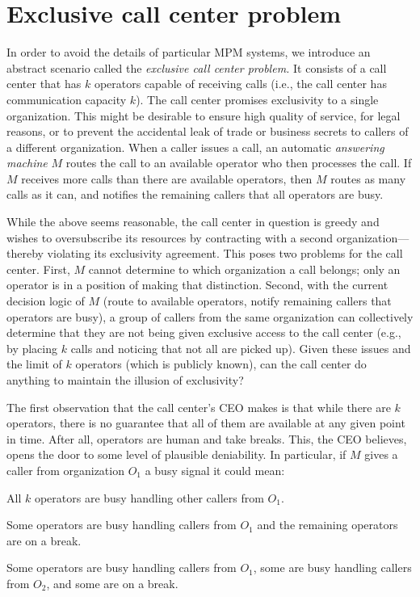 \section{Exclusive call center problem}%
\label{s:problem}

In order to avoid the details of particular MPM systems, we 
  introduce an abstract scenario called the \emph{exclusive call center problem.}
It consists of a call center that has $k$ operators capable
  of receiving calls (i.e., the call center has
  communication capacity $k$).
The call center promises exclusivity to a single organization.
This might be desirable to ensure high quality of service, 
  for legal reasons, or to prevent the accidental leak of trade or business 
  secrets to callers of a different organization.
When a caller issues a call, an automatic \emph{answering machine} $M$ routes 
  the call to an available operator who then processes the call.
If $M$ receives more calls than there are available operators, 
  then $M$ routes as many calls as it can, and notifies the remaining callers
  that all operators are busy.

While the above seems reasonable, the call center in question 
  is greedy and wishes to oversubscribe its resources by contracting with a 
  second organization---thereby violating its exclusivity agreement.
This poses two problems for the call center.
First, $M$ cannot determine to which organization a call belongs; only an
  operator is in a position of making that distinction.
Second, with the current decision logic of $M$ (route to available operators,
  notify remaining callers that operators are busy), a group of callers from 
  the same organization can collectively determine that they are not being given 
  exclusive access to the call center (e.g., by placing $k$ calls 
  and noticing that not all are picked up).
Given these issues and the limit of $k$ operators (which is publicly known), 
  can the call center do anything to maintain the illusion of exclusivity?

The first observation that the call center's CEO makes is that while there 
  are $k$ operators, there is no guarantee that all of them are available at 
  any given point in time.
After all, operators are human and take breaks.
This, the CEO believes, opens the door to some level of plausible deniability.
In particular, if $M$ gives a caller from organization $O_1$ a busy signal it 
  could mean: 
\begin{myenumerate}
\item All $k$ operators are busy handling other callers from $O_1$.
\item Some operators are busy handling callers from $O_1$ and the 
  remaining operators are on a break.
\item Some operators are busy handling callers from $O_1$, some are busy
  handling callers from $O_2$, and some are on a break.
\end{myenumerate}

